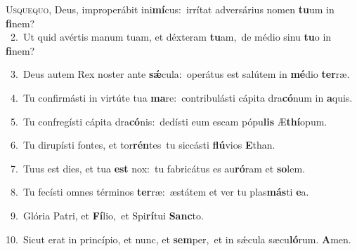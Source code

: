 \lettrine{\initial\textcolor{\initialcolor}{U}}{squequo,} Deus, improperábit ini\-\textbf{mí}\-cus:~\star irrítat adversárius nomen \textbf{tu}\-um in \textbf{fi}\-nem?\\
{\numbfont\textcolor{\numbcolor}{~2.}}~Ut quid avértis manum tuam, et déxteram \textbf{tu}\-am,~\star de médio sinu \textbf{tu}\-o in \textbf{fi}\-nem?\par
{\numbfont\textcolor{\numbcolor}{~3.}}~Deus autem Rex noster ante \textbf{sǽ}\-cula:~\star operátus est salútem in \textbf{mé}\-dio \textbf{ter}\-ræ.\par
{\numbfont\textcolor{\numbcolor}{~4.}}~Tu confirmásti in virtúte tua \textbf{ma}\-re:~\star contribulásti cápita dra\-\textbf{có}\-num in \textbf{a}\-quis.\par
{\numbfont\textcolor{\numbcolor}{~5.}}~Tu confregísti cápita dra\-\textbf{có}\-nis:~\star dedísti eum escam pópu\textbf{lis} Æ\-\textbf{thí}\-opum.\par
{\numbfont\textcolor{\numbcolor}{~6.}}~Tu dirupísti fontes, et tor\-\textbf{rén}\-tes~\star tu siccásti \textbf{flú}\-vios \textbf{E}\-than.\par
{\numbfont\textcolor{\numbcolor}{~7.}}~Tuus est dies, et tua \textbf{est} nox:~\star tu fabricátus es au\-\textbf{ró}\-ram et \textbf{so}\-lem.\par
{\numbfont\textcolor{\numbcolor}{~8.}}~Tu fecísti omnes términos \textbf{ter}\-ræ:~\star æstátem et ver tu plas\-\textbf{más}\-ti \textbf{e}\-a.\par
{\numbfont\textcolor{\numbcolor}{~9.}}~Glória Patri, et \textbf{Fí}\-lio,~\star et Spi\-\textbf{rí}\-tui \textbf{Sanc}\-to.\par
{\numbfont\textcolor{\numbcolor}{10.}}~Sicut erat in princípio, et nunc, et \textbf{sem}\-per,~\star et in sǽcula sæcu\-\textbf{ló}\-rum. \textbf{A}\-men.\par

